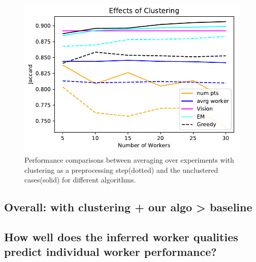 \begin{figure}[ht!]
      \centering
      \includegraphics[width=\textwidth]{plots/Effects_of_clustering.pdf}
      \caption{Performance comparisons between averaging over experiments with clustering as a preprocessing step(dotted) and the unclustered cases(solid) for different algorithms.}
      \label{cluster_effect}
\end{figure}


\subsection{Overall: with clustering + our algo > baseline}


\subsection{How well does the inferred worker qualities predict individual worker performance?}
